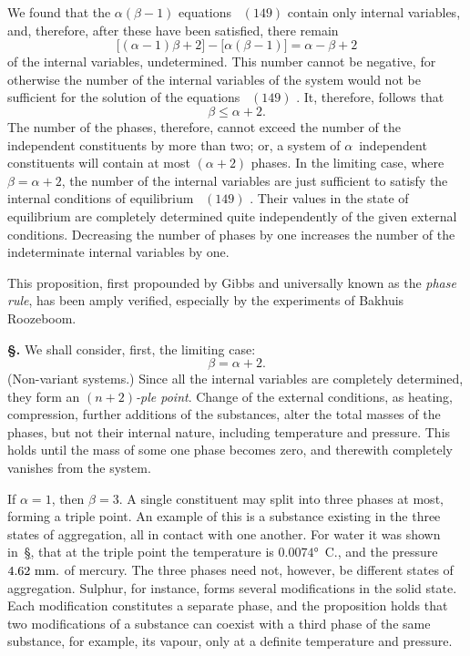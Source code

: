 \documentclass[12pt]{book}[2005/09/16]
\newcommand{\Chg}[2]{#2}
\newcommand{\Add}[1]{\Chg{}{#1}}
\newcommand{\Section}[1]{
  \medskip\par\textbf{§\;#1}
  \label{section:#1}
}
\newcommand{\SecRef}[2][§\;]{\hyperref[section:#2.]{{\upshape #1#2}}}
\newcommand{\Eq}[1]{%
  \hyperref[eqn:#1]{\ensuremath{#1}}%
}
\newcommand{\PageSep}[1]{\ignorespaces}
\newcommand{\Unit}[1]{\text{\upshape #1}}
\begin{document}
We found that the $\alpha(\beta - 1)$ equations~\Eq{(149)} contain
\PageSep{179}
only internal variables, and, therefore, after these have been
satisfied, there remain
\[
\bigl[(\alpha - 1)\beta + 2\bigr] - \bigl[\alpha (\beta - 1)\bigr] = \alpha - \beta + 2
\]
of the internal variables, undetermined. This number
cannot be negative, for otherwise the number of the
internal variables of the system would not be sufficient for
%
%
the solution of the equations~\Eq{(149)}. It, therefore, follows
that
\[
\beta \leq \alpha + 2\Add{.}
\]
The number of the phases, therefore, cannot exceed the
number of the independent constituents by more than two;
or, a system of $\alpha$~independent constituents will contain at
most $(\alpha + 2)$ phases. In the limiting case, where $\beta = \alpha + 2$,
the number of the internal variables are just sufficient to
satisfy the internal conditions of equilibrium~\Eq{(149)}. Their
values in the state of equilibrium are completely determined
quite independently of the given external conditions.
Decreasing the number of phases by one increases the
number of the indeterminate internal variables by one.

This proposition, first propounded by Gibbs and universally
%
known as the \emph{phase rule}, has been amply verified,
%
especially by the experiments of Bakhuis Roozeboom.
%

\Section{205.} We shall consider, first, the limiting case:
\[
\beta = \alpha + 2.
\]
(Non-variant systems.) Since all the internal variables are
completely determined, they form an \emph{$(n + 2)$-ple point}.
%
Change of the external conditions, as heating, compression,
further additions of the substances, alter the total masses of
the phases, but not their internal nature, including temperature
and pressure. This holds until the mass of some one
phase becomes zero, and therewith completely vanishes from
the system.

If $\alpha = 1$, then $\beta = 3$. A single constituent may split
\PageSep{180}
%
%
into three phases at most, forming a triple point. An
%
%
%
example of this is a substance existing in the three states
of aggregation, all in contact with one another. For water
it was shown in~\SecRef{187}, that at the triple point the temperature
is $0.0074°$~C., and the pressure $4.62~\Unit{mm.}$ of mercury.
The three phases need not, however, be different states of
aggregation. Sulphur, for instance, forms several modifications
%
in the solid state. Each modification constitutes a
separate phase, and the proposition holds that two modifications
of a substance can coexist with a third phase of the
same substance, for example, its vapour, only at a definite
temperature and pressure.
\end{document}

